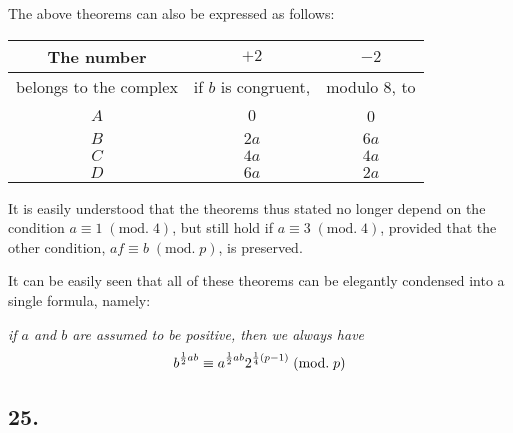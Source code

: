 \documentclass[twoside,12pt]{memoir}
\renewcommand{\pmod}[1]{\;(\textrm{mod.}\;#1)}
\let\oldfrac\frac
\def\frac#1#2{\mathchoice{\tfrac{#1}{#2}}{\oldfrac{#1}{#2}}{\genfrac{}{}{}{2}{#1}{#2\mathstrut}}{\genfrac{}{}{}{3}{#1}{#2\mathstrut}}}
\begin{document}
The above theorems can also be expressed as follows:\pagebreak%
\begin{center}
\begin{tabular}{c|c|c}
The number & \(+2\) & \(-2\) \\
\hline
belongs to the complex & \multicolumn{1}{r}{if \(b\) is congruent,}&\multicolumn{1}{l}{modulo \(8\), to } \\
\hline
\(A\) & \(0\) & 0 \\
\(B\) & \(2 a\) & \(6 a\) \\
\(C\) & \(4 a\) & \(4 a\) \\
\(D\) & \(6 a\) & \(2 a\) \\
\end{tabular}
\end{center}
It is easily understood that the theorems thus stated no longer depend on the condition \(a \equiv 1\pmod{4}\), but still hold if \(a \equiv 3\pmod{4}\), provided that the other condition, \(a f \equiv b\pmod{p}\), is preserved.

It can be easily seen that all of these theorems can be elegantly condensed into a single formula, namely:
 
\textit{if \(a\) and \(b\) are assumed to be positive, then we always have}
\[b^{\frac{1}{2} a b} \equiv a^{\frac{1}{2} a b} 2^{\frac{1}{4}(p-1)}\pmod{p}\]

\subsection*{25.}
\end{document}
